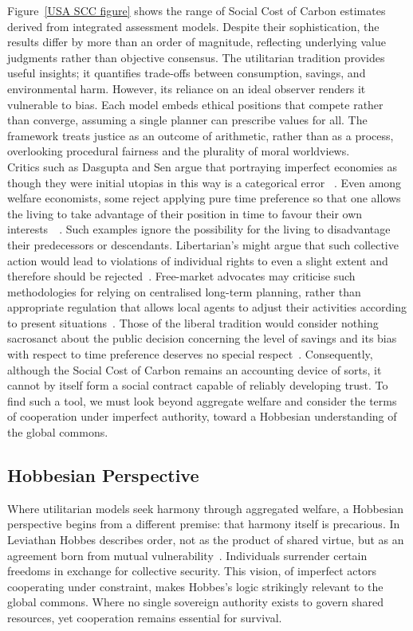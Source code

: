 Figure~\ref{USA SCC figure} shows the range of Social Cost of Carbon estimates derived from integrated assessment models.
Despite their sophistication, the results differ by more than an order of magnitude, reflecting underlying value judgments rather than objective consensus.
The utilitarian tradition provides useful insights; it quantifies trade-offs between consumption, savings, and environmental harm.
However, its reliance on an ideal observer renders it vulnerable to bias.
Each model embeds ethical positions that compete rather than converge, assuming a single planner can prescribe values for all.
The framework treats justice as an outcome of arithmetic, rather than as a process, overlooking procedural fairness and the plurality of moral worldviews.\\

Critics such as Dasgupta and Sen argue that portraying imperfect economies as though they were initial utopias in this way is a categorical error ~\cite{as1}.
Even among welfare economists, some reject applying pure time preference so that one allows the living to take advantage of their position in time to favour their own interests~\cite{hs1}~\cite{fr1}.
Such examples ignore the possibility for the living to disadvantage their predecessors or descendants.
Libertarian's might argue that such collective action would lead to violations of individual rights to even a slight extent and therefore should be rejected~\cite{rn1}.
Free-market advocates may criticise such methodologies for relying on centralised long-term planning, rather than appropriate regulation that allows local agents to adjust their activities according to present situations~\cite{fh1}.
Those of the liberal tradition would consider nothing sacrosanct about the public decision concerning the level of savings and its bias with respect to time preference deserves no special respect~\cite{jr1}.
Consequently, although the Social Cost of Carbon remains an accounting device of sorts, it cannot by itself form a social contract capable of reliably developing trust.
To find such a tool, we must look beyond aggregate welfare and consider the terms of cooperation under imperfect authority, toward a Hobbesian understanding of the global commons.\\

\subsection{Hobbesian Perspective}

Where utilitarian models seek harmony through aggregated welfare, a Hobbesian perspective begins from a different premise: that harmony itself is precarious.
In Leviathan Hobbes describes order, not as the product of shared virtue, but as an agreement born from mutual vulnerability~\cite{th1}.
Individuals surrender certain freedoms in exchange for collective security.
This vision, of imperfect actors cooperating under constraint, makes Hobbes’s logic strikingly relevant to the global commons.
Where no single sovereign authority exists to govern shared resources, yet cooperation remains essential for survival.\\

